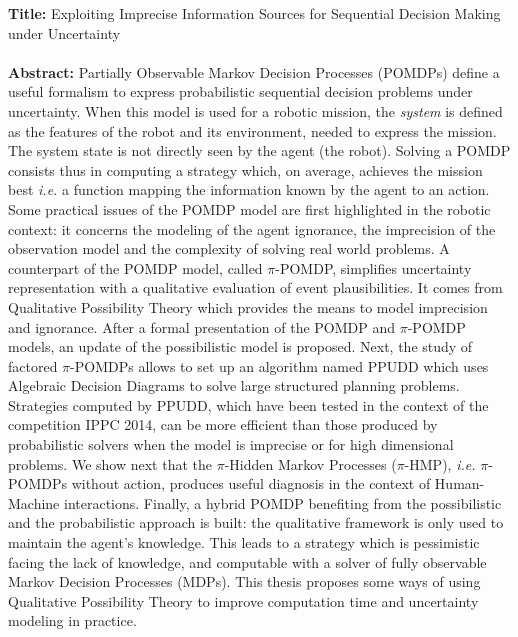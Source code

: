 \documentclass[a4paper,12pt]{article}
\begin{document}
\noindent
\textbf{Title:} Exploiting Imprecise Information Sources for Sequential Decision Making under Uncertainty\\
\vspace{-0.35cm}
\\
\textbf{Abstract:}
Partially Observable Markov Decision Processes (POMDPs) 
define a useful formalism to express probabilistic 
sequential decision problems under uncertainty.
When this model is used for a robotic mission, 
the \textit{system} is defined as the features
of the robot and its environment,
needed to express the mission.
The system state is not directly
seen by the agent (the robot).
Solving a POMDP consists thus in computing a strategy 
which, on average, achieves the mission best \textit{i.e.} 
a function mapping the information 
known by the agent to an action.
Some practical issues of the POMDP model are first highlighted 
in the robotic context: 
it concerns the modeling of the agent ignorance, 
the imprecision of the observation model
and the complexity of solving real world problems.
A counterpart of the POMDP model, called $\pi$-POMDP, 
simplifies uncertainty representation 
with a qualitative evaluation of event plausibilities.
It comes from Qualitative Possibility Theory 
which provides the means to model imprecision and ignorance.
After a formal presentation 
of the POMDP and $\pi$-POMDP models,
an update of the possibilistic model is proposed.
Next, the study of factored $\pi$-POMDPs allows to 
set up an algorithm named PPUDD which uses 
Algebraic Decision Diagrams
to solve large structured planning problems.
Strategies computed by PPUDD,
which have been tested in the context of the competition IPPC 2014,
can be more efficient than those produced by probabilistic solvers
when the model is imprecise or for high dimensional problems.
We show next that the $\pi$-Hidden Markov Processes ($\pi$-HMP),
\textit{i.e.} $\pi$-POMDPs without action,
produces useful diagnosis
in the context of Human-Machine interactions.
Finally, a hybrid POMDP 
benefiting from the possibilistic and the probabilistic 
approach is built:
the qualitative framework is only used 
to maintain the agent's knowledge.
This leads to a strategy 
which is pessimistic facing
the lack of knowledge, 
and computable with a solver of
fully observable Markov Decision Processes (MDPs).
This thesis proposes some ways of using
Qualitative Possibility Theory
to improve computation time and
uncertainty modeling in practice.\\
\vspace{-0.35cm}
\\
\end{document}
